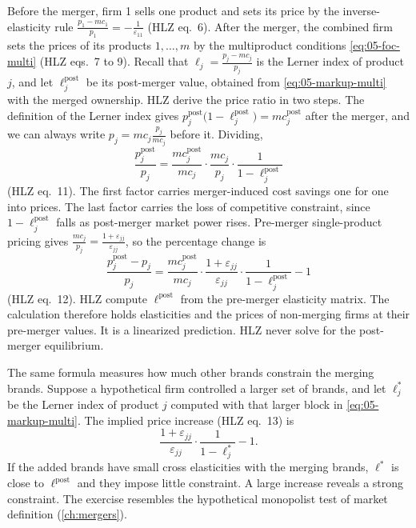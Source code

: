 Before the merger, firm 1 sells one product and sets its price by the inverse-elasticity rule
$\frac{p_1 - mc_1}{p_1} = -\frac{1}{\varepsilon_{11}}$ (HLZ eq.~6). After the merger, the combined firm sets
the prices of its products $1,\dots,m$ by the multiproduct conditions \eqref{eq:05-foc-multi} (HLZ eqs.~7 to 9).
Recall that $\ell_j = \frac{p_j - mc_j}{p_j}$ is the Lerner index of product $j$, and let $\ell_j^{\mathrm{post}}$
be its post-merger value, obtained from \eqref{eq:05-markup-multi} with the merged ownership. HLZ derive the price
ratio in two steps. The definition of the Lerner index gives $p_j^{\mathrm{post}}\bigl(1 - \ell_j^{\mathrm{post}}\bigr)
= mc_j^{\mathrm{post}}$ after the merger, and we can always write $p_j = mc_j\frac{p_j}{mc_j}$ before it. Dividing,
\begin{equation}\label{eq:05-hlz-price-ratio}
  \frac{p_j^{\mathrm{post}}}{p_j} = \frac{mc_j^{\mathrm{post}}}{mc_j}\cdot\frac{mc_j}{p_j}\cdot
  \frac{1}{1 - \ell_j^{\mathrm{post}}}
\end{equation}
(HLZ eq.~11). The first factor carries merger-induced cost savings one for one into prices. The last factor
carries the loss of competitive constraint, since $1 - \ell_j^{\mathrm{post}}$ falls as post-merger market power
rises. Pre-merger single-product pricing gives $\frac{mc_j}{p_j} = \frac{1 + \varepsilon_{jj}}{\varepsilon_{jj}}$,
so the percentage change is
\begin{equation}\label{eq:05-hlz-price-change}
  \frac{p_j^{\mathrm{post}} - p_j}{p_j} = \frac{mc_j^{\mathrm{post}}}{mc_j}\cdot\frac{1 + \varepsilon_{jj}}{\varepsilon_{jj}}
  \cdot\frac{1}{1 - \ell_j^{\mathrm{post}}} - 1
\end{equation}
(HLZ eq.~12). HLZ compute $\ell^{\mathrm{post}}$ from the pre-merger elasticity matrix. The calculation therefore
holds elasticities and the prices of non-merging firms at their pre-merger values. It is a linearized prediction.
HLZ never solve for the post-merger equilibrium.

The same formula measures how much other brands constrain the merging brands. Suppose a hypothetical firm
controlled a larger set of brands, and let $\ell_j^{*}$ be the Lerner index of product $j$ computed with that
larger block in \eqref{eq:05-markup-multi}. The implied price increase (HLZ eq.~13) is
\begin{equation*}
  \frac{1 + \varepsilon_{jj}}{\varepsilon_{jj}}\cdot\frac{1}{1 - \ell_j^{*}} - 1.
\end{equation*}
If the added brands have small cross elasticities with the merging brands, $\ell^{*}$ is close to
$\ell^{\mathrm{post}}$ and they impose little constraint. A large increase reveals a strong constraint. The exercise resembles the
hypothetical monopolist test of market definition (\cref{ch:mergers}).

